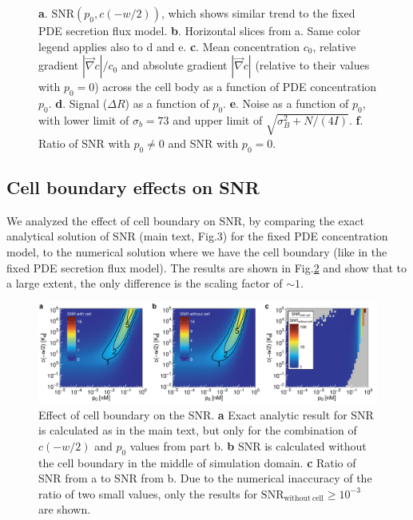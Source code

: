 \documentclass[10pt]{article}
\begin{document}
\begin{figure}[!ht]
{		\textbf{a}. $\mathrm{SNR}(p_0, c(-w/2))$, which shows similar trend to the fixed PDE secretion flux model.
		\textbf{b}. Horizontal slices from a. Same color legend applies also to d and e.
		\textbf{c}. Mean concentration $c_0$, relative gradient $|\vec{\nabla}c|/c_0$ and absolute gradient $|\vec{\nabla}c|$ (relative to their values with $p_0=0$) across the cell body as a function of PDE concentration $p_0$. 
		\textbf{d}. Signal ($\Delta R$) as a function of $p_0$. 
		\textbf{e}. Noise as a function of $p_0$, with lower limit of $\sigma_b = 73$ and upper limit of $\sqrt{\sigma_B^2 + N/(4I)}$.
		\textbf{f}. Ratio of SNR with $p_0 \neq 0$ and SNR with $p_0=0$. 		
	}
	\label{fig:uniform_pde_snr}
\end{figure}



\subsection{Cell boundary effects on SNR}


We analyzed the effect of cell boundary on SNR, by comparing the exact analytical solution of SNR (main text, Fig.3) for the fixed PDE concentration model, to the numerical solution where we have the cell boundary (like in the fixed PDE secretion flux model). The results are shown in Fig.\ref{fig:si3} and show that to a large extent, the only difference is the scaling factor of $\sim 1$.
\begin{figure}[ht!]
	\centering
	\includegraphics[scale=0.43]{../figures/si_pde_uniform_compare_with_without_cell}
	\caption{
		Effect of cell boundary on the SNR.
		\textbf{a} Exact analytic result for SNR is calculated as in the main text, but only for the combination of $c(-w/2)$ and $p_0$ values from part b.
		\textbf{b} SNR is calculated without the cell boundary in the middle of simulation domain.
		\textbf{c} Ratio of SNR from a to SNR from b. Due to the numerical inaccuracy of the ratio of two small values, only the results for $\mathrm{SNR_{without\ cell}} \geq 10^{-3}$ are shown.
	}
	\label{fig:si3}
\end{figure}
\end{document}

